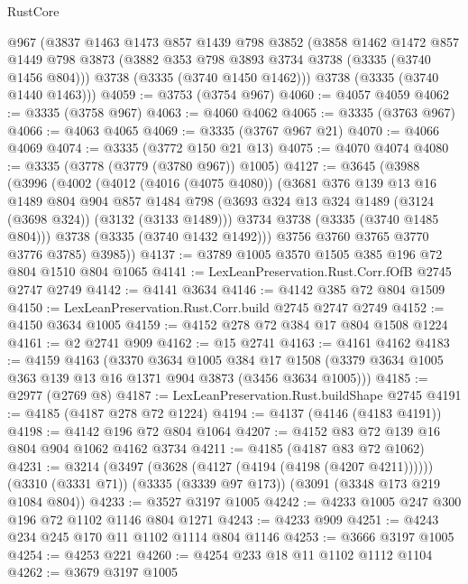 \begin{lexlean}{RustCore}
\begin{coremodule}
    @967
    (@3837
      @1463
      @1473
      @857
      @1439
      @798
      @3852
      (@3858
        @1462
        @1472
        @857
        @1449
        @798
        @3873
        (@3882 @353 @798 @3893 @3734 @3738 (@3335 (@3740 @1456 @804)))
        @3738
        (@3335 (@3740 @1450 @1462)))
      @3738
      (@3335 (@3740 @1440 @1463)))
@4059 := @3753 (@3754 @967)
@4060 := @4057 @4059
@4062 := @3335 (@3758 @967)
@4063 := @4060 @4062
@4065 := @3335 (@3763 @967)
@4066 := @4063 @4065
@4069 := @3335 (@3767 @967 @21)
@4070 := @4066 @4069
@4074 := @3335 (@3772 @150 @21 @13)
@4075 := @4070 @4074
@4080 := @3335 (@3778 (@3779 (@3780 @967)) @1005)
@4127 := @3645
    (@3988
      (@3996
        (@4002
          (@4012
            (@4016 (@4075 @4080))
            (@3681
              @376
              @139
              @13
              @16
              @1489
              @804
              @904
              @857
              @1484
              @798
              (@3693 @324 @13 @324 @1489 (@3124 (@3698 @324)) (@3132 (@3133 @1489)))
              @3734
              @3738
              (@3335 (@3740 @1485 @804)))
            @3738
            (@3335 (@3740 @1432 @1492)))
          @3756
          @3760
          @3765
          @3770
          @3776
          @3785)
        @3985))
@4137 := @3789 @1005 @3570 @1505 @385 @196 @72 @804 @1510 @804 @1065
@4141 := LexLeanPreservation.Rust.Corr.fOfB @2745 @2747 @2749
@4142 := @4141 @3634
@4146 := @4142 @385 @72 @804 @1509
@4150 := LexLeanPreservation.Rust.Corr.build @2745 @2747 @2749
@4152 := @4150 @3634 @1005
@4159 := @4152 @278 @72 @384 @17 @804 @1508 @1224
@4161 := @2 @2741 @909
@4162 := @15 @2741
@4163 := @4161 @4162
@4183 := @4159
    @4163
    (@3370
      @3634
      @1005
      @384
      @17
      @1508
      (@3379 @3634 @1005 @363 @139 @13 @16 @1371 @904 @3873 (@3456 @3634 @1005)))
@4185 := @2977 (@2769 @8)
@4187 := LexLeanPreservation.Rust.buildShape @2745
@4191 := @4185 (@4187 @278 @72 @1224)
@4194 := @4137 (@4146 (@4183 @4191))
@4198 := @4142 @196 @72 @804 @1064
@4207 := @4152 @83 @72 @139 @16 @804 @904 @1062 @4162 @3734
@4211 := @4185 (@4187 @83 @72 @1062)
@4231 := @3214
    (@3497 (@3628 (@4127 (@4194 (@4198 (@4207 @4211))))))
    (@3310 (@3331 @71))
    (@3335 (@3339 @97 @173))
    (@3091 (@3348 @173 @219 @1084 @804))
@4233 := @3527 @3197 @1005
@4242 := @4233 @1005 @247 @300 @196 @72 @1102 @1146 @804 @1271
@4243 := @4233 @909
@4251 := @4243 @234 @245 @170 @11 @1102 @1114 @804 @1146
@4253 := @3666 @3197 @1005
@4254 := @4253 @221
@4260 := @4254 @233 @18 @11 @1102 @1112 @1104
@4262 := @3679 @3197 @1005

\end{coremodule}
\end{lexlean}
